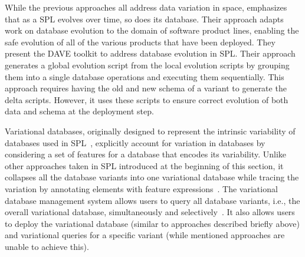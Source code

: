 While the previous approaches all address data variation in space, 
\cite{dbSPLevolve} emphasizes that as a SPL evolves over time, so does its
database. Their approach adapts work on database evolution to the
domain of software product lines, enabling the safe evolution of all of the
various products that have been deployed.
%
 They present the DAVE toolkit to address database evolution in SPL. Their
 approach generates a global evolution script from the local evolution scripts
 by grouping them into a single database operations and executing them
 sequentially. This approach requires having the old and new schema of a
 variant to generate the delta scripts. However, it uses these scripts to
 ensure correct evolution of both data and schema at the deployment step. 

 Variational databases, originally designed to represent the intrinsic
 variability of databases used in SPL~\cite{ATW18poly}, explicitly account for
 variation in databases by considering a set of features for a database that
 encodes its variability. Unlike other approaches taken in SPL introduced at
 the beginning of this section, it collapses all the database variants into
 one variational database while tracing the variation by annotating elements
 with feature expressions~\cite{ATW17dbpl}. The variational database
 management system allows users to query all database variants, i.e., the
 overall variational database, simultaneously and
 selectively~\cite{vldbArXiv}. It also allows users to deploy the variational
 database (similar to approaches described briefly above) and variational
 queries for a specific variant (while mentioned approaches are unable to
 achieve this).


